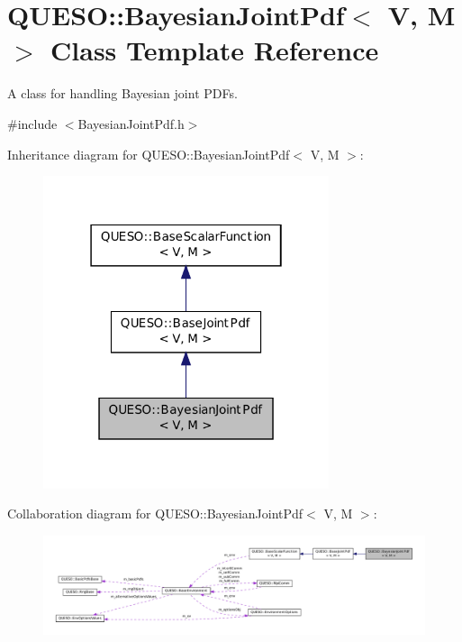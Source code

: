 \hypertarget{class_q_u_e_s_o_1_1_bayesian_joint_pdf}{\section{Q\-U\-E\-S\-O\-:\-:Bayesian\-Joint\-Pdf$<$ V, M $>$ Class Template Reference}
\label{class_q_u_e_s_o_1_1_bayesian_joint_pdf}
}


A class for handling Bayesian joint P\-D\-Fs.  




{\ttfamily \#include $<$Bayesian\-Joint\-Pdf.\-h$>$}



Inheritance diagram for Q\-U\-E\-S\-O\-:\-:Bayesian\-Joint\-Pdf$<$ V, M $>$\-:
\nopagebreak
\begin{figure}[H]
\begin{center}
\leavevmode
\includegraphics[width=238pt]{class_q_u_e_s_o_1_1_bayesian_joint_pdf__inherit__graph}
\end{center}
\end{figure}


Collaboration diagram for Q\-U\-E\-S\-O\-:\-:Bayesian\-Joint\-Pdf$<$ V, M $>$\-:
\nopagebreak
\begin{figure}[H]
\begin{center}
\leavevmode
\includegraphics[width=350pt]{class_q_u_e_s_o_1_1_bayesian_joint_pdf__coll__graph}
\end{center}
\end{figure}
